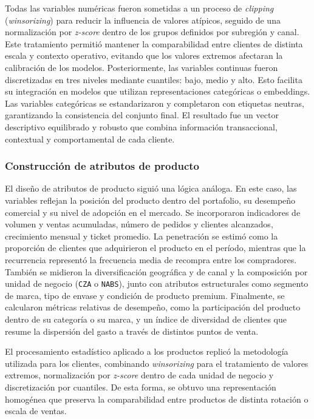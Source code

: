 Todas las variables numéricas fueron sometidas a un proceso de \textit{clipping} (\textit{winsorizing}) \cite{BOOK:Aggarwal2015} para reducir la influencia de valores atípicos, seguido de una normalización por \textit{z-score} dentro de los grupos definidos por subregión y canal. Este tratamiento permitió mantener la comparabilidad entre clientes de distinta escala y contexto operativo, evitando que los valores extremos afectaran la calibración de los modelos. Posteriormente, las variables continuas fueron discretizadas en tres niveles mediante cuantiles: bajo, medio y alto. Esto facilita su integración en modelos que utilizan representaciones categóricas o embeddings. Las variables categóricas se estandarizaron y completaron con etiquetas neutras, garantizando la consistencia del conjunto final. El resultado fue un vector descriptivo equilibrado y robusto que combina información transaccional, contextual y comportamental de cada cliente.

\subsubsection{Construcción de atributos de producto}

El diseño de atributos de producto siguió una lógica análoga. En este caso, las variables reflejan la posición del producto dentro del portafolio, su desempeño comercial y su nivel de adopción en el mercado. Se incorporaron indicadores de volumen y ventas acumuladas, número de pedidos y clientes alcanzados, crecimiento mensual y ticket promedio. La penetración se estimó como la proporción de clientes que adquirieron el producto en el período, mientras que la recurrencia representó la frecuencia media de recompra entre los compradores. También se midieron la diversificación geográfica y de canal y la composición por unidad de negocio (\texttt{CZA} o \texttt{NABS}), junto con atributos estructurales como segmento de marca, tipo de envase y condición de producto premium. Finalmente, se calcularon métricas relativas de desempeño, como la participación del producto dentro de su categoría o su marca, y un índice de diversidad de clientes que resume la dispersión del gasto a través de distintos puntos de venta.

El procesamiento estadístico aplicado a los productos replicó la metodología utilizada para los clientes, combinando \textit{winsorizing} para el tratamiento de valores extremos, normalización por \textit{z-score} dentro de cada unidad de negocio y discretización por cuantiles. De esta forma, se obtuvo una representación homogénea que preserva la comparabilidad entre productos de distinta rotación o escala de ventas.

